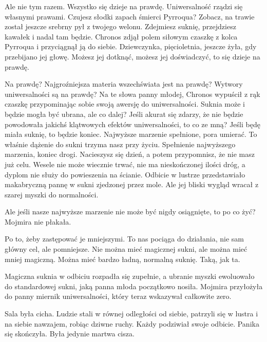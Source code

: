 \ds{} Ale nie tym razem. Wszystko się dzieje na prawdę. Uniwersalność rządzi się własnymi prawami. 
Czujesz słodki zapach śmierci Pyrroqua? Zobacz, na trawie został jeszcze srebrny pył z twojego welonu. 
Zdejmiesz suknię, przejdziesz kawałek i nadal tam będzie. \dm{} Chronos zdjął polem siłowym czaszkę z kolca Pyrroqua i przyciągnął ją do siebie. \dm{}
Dziewczynka, pięcioletnia, jeszcze żyła, gdy przebijano jej głowę. Możesz jej dotknąć, możesz jej doświadczyć, to się dzieje na prawdę. \de{}

\ds{} Na prawdę? Najgroźniejsza materia wszechświata jest na prawdę? Wytwory uniwersalności są na prawdę? \dm{} Na te słowa panny młodej, Chronos wypuścił z rąk czaszkę
przypominając sobie swoją awersję do uniwersalności. \dm{} Suknia może i będzie mogła być ubrana, ale co dalej? Jeśli akurat się zdarzy, że nie będzie powodowała
jakichś klątwowych efektów uniwersalności, to co ze mną? Jeśli będę miała suknię, to będzie koniec. Najwyższe marzenie spełnione, pora umierać.
To właśnie dążenie do sukni trzyma nasz przy życiu. Spełnienie najwyższego marzenia, koniec drogi. Nacieszysz się dzień, a potem przypomnisz, że nie masz już celu.
Wesele nie może wiecznie trwać, nie ma nieskończonej ilości dróg, a dyplom nie służy do powieszenia na ścianie. \dm{} Odbicie w lustrze przedstawiało makabryczną pannę w 
sukni zjedzonej przez mole. Ale jej bliski wygląd wracał z szarej myszki do normalności. \de{}

\ds{} Ale jeśli nasze najwyższe marzenie nie może być nigdy osiągnięte, to po co żyć? \dm{} Mojmira nie płakała. \de{}

\ds{} Po to, żeby zastępować je mniejszymi. To nas pociąga do działania, nie sam główny cel, ale pomniejsze. 
Nie można mieć magicznej sukni, ale można mieć mniej magiczną. Można mieć bardzo ładną, normalną suknię.
Taką, jak ta. \de{} 

Magiczna suknia w odbiciu rozpadła się zupełnie, a ubranie myszki ewoluowało do standardowej sukni, jaką panna młoda początkowo nosiła.
Mojmira przyłożyła do panny miernik uniwersalności, który teraz wskazywał całkowite zero.

\divider{}

Sala była cicha. 
Ludzie stali w równej odległości od siebie, patrzyli się w lustra i na siebie nawzajem, robiąc dziwne ruchy.
Każdy podziwiał swoje odbicie. Panika się skończyła. Była jedynie martwa cisza.

